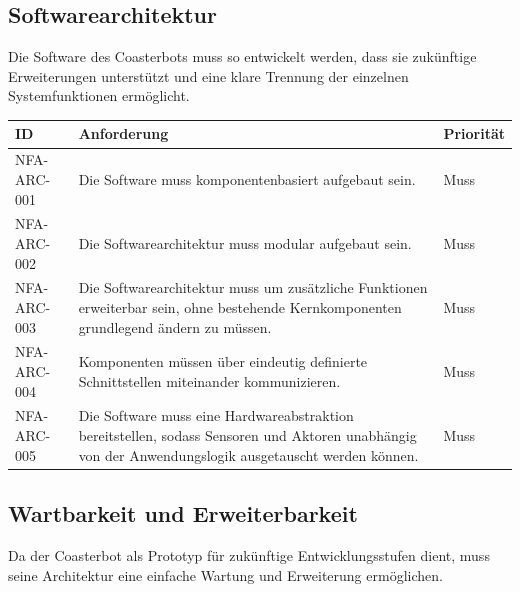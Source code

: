 \subsection{Softwarearchitektur}\label{softwarearchitektur}

Die Software des Coasterbots muss so entwickelt werden, dass sie
zukünftige Erweiterungen unterstützt und eine klare Trennung der
einzelnen Systemfunktionen ermöglicht.

\begin{longtable}[]{@{}
  >{\raggedright\arraybackslash}p{}
  >{\raggedright\arraybackslash}p{}
  >{\raggedright\arraybackslash}p{}@{}}
\toprule\noalign{}
\begin{minipage}[b]{\linewidth}\raggedright
ID
\end{minipage} & \begin{minipage}[b]{\linewidth}\raggedright
Anforderung
\end{minipage} & \begin{minipage}[b]{\linewidth}\raggedright
Priorität
\end{minipage} \\
\midrule\noalign{}
\endhead
\bottomrule\noalign{}
\endlastfoot
NFA-ARC-001 & Die Software muss komponentenbasiert aufgebaut sein. &
Muss \\
NFA-ARC-002 & Die Softwarearchitektur muss modular aufgebaut sein. &
Muss \\
NFA-ARC-003 & Die Softwarearchitektur muss um zusätzliche Funktionen
erweiterbar sein, ohne bestehende Kernkomponenten grundlegend ändern zu
müssen. & Muss \\
NFA-ARC-004 & Komponenten müssen über eindeutig definierte
Schnittstellen miteinander kommunizieren. & Muss \\
NFA-ARC-005 & Die Software muss eine Hardwareabstraktion bereitstellen,
sodass Sensoren und Aktoren unabhängig von der Anwendungslogik
ausgetauscht werden können. & Muss \\
\end{longtable}

\subsection{Wartbarkeit und
Erweiterbarkeit}\label{wartbarkeit-und-erweiterbarkeit}

Da der Coasterbot als Prototyp für zukünftige Entwicklungsstufen dient,
muss seine Architektur eine einfache Wartung und Erweiterung
ermöglichen.

